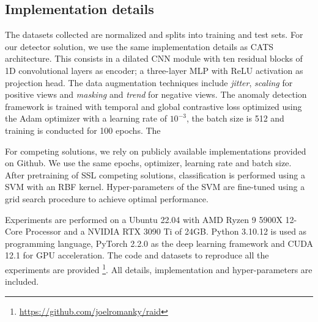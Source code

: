 \subsection{Implementation details}
The datasets collected are normalized and splits into training and test sets.
For our detector solution, we use the same implementation details as CATS architecture. This consists in a dilated CNN module with ten residual blocks of 1D convolutional layers as encoder; a three-layer MLP with ReLU activation as projection head. The data augmentation techniques include \textit{jitter}, \textit{scaling} for positive views and \textit{masking} and \textit{trend} for negative views. The anomaly detection framework is trained with temporal and global contrastive loss optimized using the Adam optimizer with a learning rate of $10^{-3}$, the batch size is 512 and training is conducted for 100 epochs. The

For competing solutions, we rely on publicly available implementations provided on Github. We use the same epochs, optimizer, learning rate and batch size. After pretraining of SSL competing solutions, classification is performed using a SVM with an RBF kernel. Hyper-parameters of the SVM are fine-tuned using a grid search procedure to achieve optimal performance.

Experiments are performed on a Ubuntu 22.04 with AMD Ryzen 9 5900X 12-Core Processor and a NVIDIA RTX 3090 Ti of 24GB. Python 3.10.12 is used as programming language, PyTorch 2.2.0 as the deep learning framework and CUDA 12.1 for GPU acceleration. The code and datasets to reproduce all the experiments are provided \footnote{\url{https://github.com/joelromanky/raid}}. All details, implementation and hyper-parameters are included.
